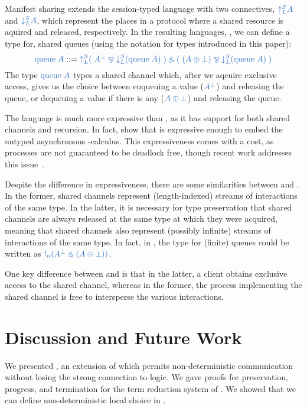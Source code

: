 \documentclass[envcountsame,envcountsect,UKenglish]{llncs}
\begin{document}
Manifest sharing extends the session-typed language \SILL with two connectives, $\ty{\acquire{A}}$ and $\ty{\release{A}}$, which represent the places in a protocol where a shared resource is aquired and released, respectively. In the resulting languages, \SILLS, we can define a type for, \eg shared queues (using the notation for types introduced in this paper):
\[
  \ty{\queue{A}} ::=
  \ty{\acquire{
      (\; A^\bot \parr \release{(\queue{A})} \;)
      \with
      (\; (A \plus \bot) \parr \release{(\queue{A})} \;)
    }}
\]
The type $\ty{\queue{A}}$ types a shared channel which, after we aqcuire exclusive access, gives us the choice between enqueuing a value ($\ty{A^\bot}$) and releasing the queue, or dequeuing a value if there is any ($\ty{A \plus \bot}$) and releasing the queue.

The language \SILLS is much more expressive than \nodcap, as it has support for both shared channels and recursion.
In fact, \textcite{balzer2018} show that \SILLS is expressive enough to embed the untyped asynchronous \textpi-calculus. This expressiveness comes with a cost, as \SILLS processes are not guaranteed to be deadlock free, though recent work addresses this issue~\parencite{balzer2019}.

Despite the difference in expressiveness, there are some similarities between \nodcap and \SILLS. In the former, shared channels represent (length-indexed) streams of interactions of the same type. In the latter, it is necessary for type preservation that shared channels are always released at the same type at which they were acquired, meaning that shared channels also represent (possibly infinite) streams of interactions of the same type. In fact, in \nodcap, the type for (finite) queues could be written as $\ty{\take[n]{(A^\bot \with (A \plus \bot))}}$.

One key difference between \nodcap and \SILLS is that in the latter, a client obtains exclusive access to the shared channel, whereas in the former, the process implementing the shared channel is free to intersperse the various interactions.
  
\section{Discussion and Future Work}\label{sec:conclusion}
We presented \nodcap, an extension of \hcp which permits non-deterministic communication without losing the strong connection to logic.
We gave proofs for preservation, progress, and termination for the term reduction system of \nodcap.
We showed that we can define non-deterministic local choice in \nodcap.
\end{document}
